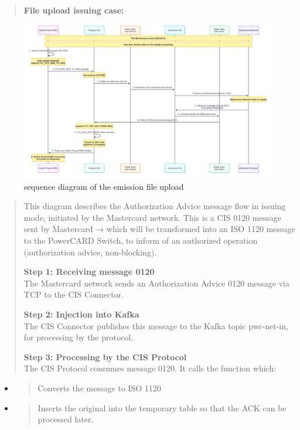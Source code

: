 \documentclass[12pt,a4paper]{report}
\begin{document}
\begin{quote}
\textbf{File upload issuing case:}
\end{quote}

\begin{figure}[H]
\centering
\includegraphics[width=6in,height=1\textheight,keepaspectratio]{media/image42.png}
\caption{sequence diagram of the emission file upload}
\label{fig:SDEA}
\end{figure}

\begin{quote}
This diagram describes the Authorization Advice message flow in issuing
mode, initiated by the Mastercard network. This is a CIS 0120 message
sent by Mastercard → which will be transformed into an ISO 1120 message
to the PowerCARD Switch, to inform of an authorized operation
(authorization advice, non-blocking).

\textbf{Step 1: Receiving message 0120}\\
The Mastercard network sends an Authorization Advice 0120 message via
TCP to the CIS Connector.

\textbf{Step 2: Injection into Kafka}\\
The CIS Connector publishes this message to the Kafka topic pwc-net-in,
for processing by the protocol.

\textbf{Step 3: Processing by the CIS Protocol}\\
The CIS Protocol consumes message 0120. It calls the function which:
\end{quote}

\begin{itemize}
\item
  \begin{quote}
  Converts the message to ISO 1120
  \end{quote}
\item
  \begin{quote}
  Inserts the original into the temporary table so that the ACK can be
  processed later.
  \end{quote}
\end{itemize}
\end{document}
